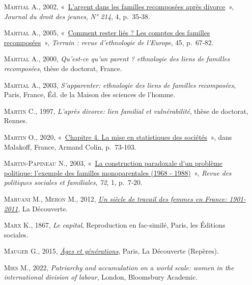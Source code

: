\documentclass[
  12pt,
]{book}
\newlength{\cslhangindent}
\newenvironment{CSLReferences}[2] %
 {\begin{list}{}{%
  \setlength{\itemindent}{0pt}
  \setlength{\leftmargin}{0pt}
  \setlength{\parsep}{0pt}
  \ifodd #1
   \setlength{\leftmargin}{\cslhangindent}
   \setlength{\itemindent}{-1\cslhangindent}
  \fi
  \setlength{\itemsep}{#2\baselineskip}}}
 {\end{list}}
\begin{document}
\begin{CSLReferences}{0}{1}
\textsc{Martial A.}, 2002,
{«~\href{http://www.cairn.info/revue-journal-du-droit-des-jeunes-2002-4-page-35.htm}{L'argent
dans les familles recomposées après divorce}~»}, \emph{Journal du droit
des jeunes}, \emph{N° 214}, 4, p.~35‑38.

\textsc{Martial A.}, 2005,
{«~\href{https://doi.org/10.4000/terrain.3550}{Comment rester liés ? Les
comptes des familles recomposées}~»}, \emph{Terrain : revue d'ethnologie
de l'Europe}, 45, p.~67‑82.

\textsc{Martial A.}, 2000, \emph{Qu'est-ce qu'un parent ? ethnologie des
liens de familles recomposées}, thèse de doctorat, France.

\textsc{Martial A.}, 2003, \emph{S'apparenter: ethnologie des liens de
familles recomposées}, Paris, France, Éd. de la Maison des sciences de
l'homme.

\textsc{Martin C.}, 1997, \emph{L'après divorce: lien familial et
vulnérabilité}, thèse de doctorat, Rennes.

\textsc{Martin O.}, 2020,
{«~\href{https://www.cairn.info/l-empire-des-chiffres--9782200625719-page-73.htm}{Chapitre
4. La mise en statistiques des sociétés}~»}, dans Malakoff, France,
Armand Colin, p.~73‑103.

\textsc{Martin-Papineau N.}, 2003,
{«~\href{https://doi.org/10.3406/caf.2003.1983}{La construction
paradoxale d{'}un problème politique: l{'}exemple des familles
monoparentales (1968 - 1988)}~»}, \emph{Revue des politiques sociales et
familiales}, \emph{72}, 1, p.~7‑20.

\textsc{Maruani M.}, \textsc{Meron M.}, 2012,
\emph{\href{https://doi.org/10.3917/dec.marua.2012.01}{Un siècle de
travail des femmes en France: 1901- 2011}}, La Découverte.

\textsc{Marx K.}, 1867, \emph{Le capital}, Reproduction en fac-similé,
Paris, les Éditions sociales.

\textsc{Mauger G.}, 2015,
\emph{\href{https://www.cairn.info/ages-et-generations--9782707158888.htm}{Âges
et générations}}, Paris, La Découverte (Repères).

\textsc{Mies M.}, 2022, \emph{Patriarchy and accumulation on a world
scale: women in the international division of labour}, London,
Bloomsbury Academic.


\end{CSLReferences}
\end{document}

